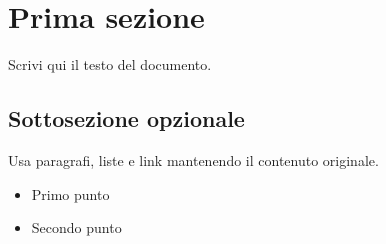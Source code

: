 \documentclass[letter]{polinetwork}
\begin{document}
\pnMakeHeader

\section{Prima sezione}

Scrivi qui il testo del documento.

\subsection{Sottosezione opzionale}

Usa paragrafi, liste e link mantenendo il contenuto originale.

\begin{itemize}
  \item Primo punto
  \item Secondo punto
\end{itemize}
\end{document}
